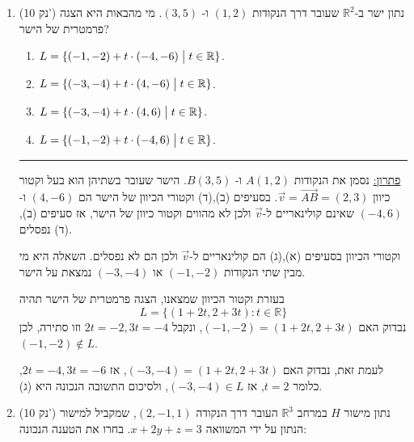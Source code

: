 \documentclass[12pt, a4paper]{article}
\newcommand{\rr}{\mathbb{R}}
\newcommand{\points}[1]{(#1 נק') }
\begin{document}
\begin{enumerate}





\item\points{10}
נתון ישר ב-$\rr^2$
שעובר דרך הנקודות
$(1,2)$
ו-
$(3,5)$.
מי מהבאות היא הצגה פרמטרית של הישר?
\begin{enumerate}
\item
$L=\{ (-1,-2)+t\cdot (-4,-6)\bigm|
t\in\rr\}$.
\item
$L=\{ (-3,-4)+t\cdot (4,-6)\bigm|
t\in\rr\}$.
\item
$L=\{ (-3,-4)+t\cdot (4,6)\bigm|
t\in\rr\}$.
\item
$L=\{ (-1,-2)+t\cdot (-4,6)\bigm|
t\in\rr\}$.
\end{enumerate}

\noindent\rule{16cm}{0.4pt}

\underline{פתרון:}
נסמן את הנקודות
$A(1,2)$
ו-
$B(3,5)$.
הישר שעובר בשתיהן הוא בעל וקטור כיוון
$\vec{v}=\vec{AB}=(2,3)$.
בסעיפים (ב),(ד) וקטורי הכיוון של הישר הם
$(4,-6)$
ו-$(-4,6)$
שאינם קולינאריים ל-$\vec{v}$
ולכן לא מהווים וקטור כיוון של הישר, אז סעיפים (ב),(ד) נפסלים.

וקטורי הכיוון בסעיפים (א),(ג) הם קולינאריים ל-$\vec{v}$
ולכן הם לא נפסלים. 
השאלה היא מי מבין שתי הנקודות
$(-1,-2)$
או
$(-3,-4)$
נמצאת על הישר.

בעזרת וקטור הכיוון שמצאנו, הצגה פרמטרית של הישר תהיה
$$L=\{(1+2t,2+3t) : t\in\rr
\}$$
נבדוק האם
$(-1,-2)=(1+2t,2+3t)$,
ונקבל
$2t=-2, 3t=-4$
וזו סתירה, לכן
$(-1,-2)\not\in L$.

לעמת זאת, נבדוק האם
$(-3,-4)=(1+2t,2+3t)$,
אז
$2t=-4,3t=-6$,
כלומר
$t=2$,
אז
$(-3,-4)\in L$,
ולסיכום התשובה הנכונה היא (ג).

\newpage

\item\points{10}
נתון מישור
$H$
במרחב
$\rr^3$
העובר דרך הנקודה
$(2,-1,1)$,
שמקביל למישור הנתון על ידי המשוואה
$x+2y+z=3$.
בחרו את הטענה הנכונה:
\begin{enumerate}
\end{enumerate}


\end{enumerate}
\end{document}
